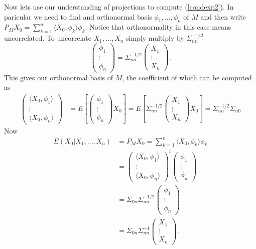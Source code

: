 \documentclass[11pt]{report}
\begin{document}
Now lets use our understanding of projections to compute (\ref{condexp2}). In paricular we need to find and orthonormal basis $\phi_1,\ldots, \phi_n$ of $M$ and then write $P_M X_0 = \sum_{k=1}^n \langle X_0, \phi_k \rangle \phi_k$. Notice that orthonormality in this case means uncorrelated. To uncorrelate $X_1,\ldots, X_n$ simply multiply by $\Sigma_{nn}^{-1/2}$
\[\begin{pmatrix}
\phi_1 \\ \vdots \\\phi_n
\end{pmatrix}
=
\Sigma_{nn}^{-1/2} \begin{pmatrix}
X_1 \\ \vdots \\X_n
\end{pmatrix}.
  \]
This gives our orthonormal basis of $M$, the coefficient of which  can be computed as
 \begin{align*}
  \begin{pmatrix}
\langle X_0,\phi_1\rangle \\ \vdots \\\langle X_0,\phi_n\rangle
\end{pmatrix}
&=E\left[\begin{pmatrix}
\phi_1 \\ \vdots \\\phi_n
\end{pmatrix} X_0\right]  = E\left[\Sigma_{nn}^{-1/2} 
 \begin{pmatrix} X_1 \\ \vdots \\X_n \end{pmatrix}
 X_0\right] = \Sigma_{nn}^{-1/2} \Sigma_{n0}  
\end{align*}
Now 
\begin{align*}
E(X_0|X_1,\ldots, X_n)&=P_M X_0= \sum_{k=1}^n \langle X_0, \phi_k \rangle \phi_k \\
 & = \begin{pmatrix}
\langle X_0,\phi_1\rangle \\ \vdots \\\langle X_0,\phi_n\rangle
\end{pmatrix}^t
\begin{pmatrix}
\phi_1 \\ \vdots \\\phi_n
\end{pmatrix}\\
& =\Sigma_{0n}\Sigma_{nn}^{-1/2}\begin{pmatrix}
\phi_1 \\ \vdots \\\phi_n
\end{pmatrix}\\
& =\Sigma_{0n}\Sigma_{nn}^{-1} \begin{pmatrix}
X_1 \\ \vdots \\X_n
\end{pmatrix}.
\end{align*}
\end{document}
